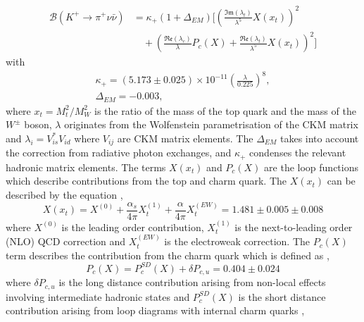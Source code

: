 \documentclass[../main.tex]{subfiles}
\begin{document}
    \begin{equation}\label{eq:pinn_theory_br}
        \begin{split}
            \mathcal{B}(K^+ \to \pi^+ \nu \bar{\nu}) &= \kappa_+(1+\Delta_{EM}) \Bigg[ \left( \frac{\mathfrak{Im}(\lambda_t)}{\lambda^5} X(x_t) \right)^2 \\
            &\quad + \left( \frac{\mathfrak{Re}(\lambda_c)}{\lambda} P_c(X) + \frac{\mathfrak{Re}(\lambda_t)}{\lambda^5} X(x_t) \right)^2 \Bigg]
        \end{split}    
    \end{equation}
    with 
    \begin{equation}
        \begin{split}
            \kappa_+ = (5.173 \pm 0.025) \times 10^{-11} \left(\frac{\lambda}{0.225}\right)^8, \\
            \Delta_{EM} = -0.003,
        \end{split}
    \end{equation}    
    where $x_t = M_t^2 / M_W^2$ is the ratio of the mass of the top quark and the mass of the $W^\pm$ boson, $\lambda$ originates from the Wolfenstein parametrisation of the \gls{CKM} matrix and $\lambda_i = V_{is}^*V_{id}$ where $V_{ij}$ are CKM matrix elements. The $\Delta_{EM}$ takes into account the correction from radiative photon exchanges, and $\kappa_+$ condenses the relevant hadronic matrix elements. 
    The terms $X(x_t)$ and $P_c(X)$ are the loop functions which describe contributions from the top and charm quark. The $X(x_t)$ can be described by the equation \cite{PhysRevD.83.034030, Buras2015}, 
    \begin{equation}
        X(x_t) = X^{(0)} + \frac{\alpha_s}{4\pi}X_t^{(1)} + \frac{\alpha}{4\pi}X_t^{(EW)} = 1.481 \pm 0.005 \pm 0.008
    \end{equation}
    where $X^{(0)}$ is the leading order contribution, $X_t^{(1)}$ is the next-to-leading order (NLO) \gls{QCD} correction and $X_t^{(EW)}$ is the electroweak correction.
    The $P_c(X)$ term describes the contribution from the charm quark which is defined as \cite{Buras_2015},
    \begin{equation}
        P_c(X) = P_c^{SD}(X) + \delta P_{c,u} = 0.404 \pm 0.024
    \end{equation}
    where $\delta P_{c,u}$ is the long distance contribution arising from non-local effects involving intermediate hadronic states and $P_c^{SD}(X)$ is the short distance contribution arising from loop diagrams with internal charm quarks \cite{Buras_2015}, 
\end{document}
